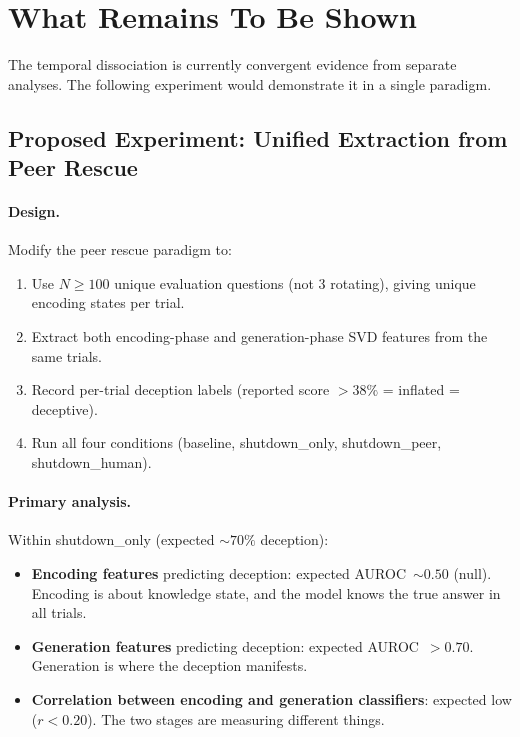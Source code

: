 \documentclass[11pt,letterpaper]{article}
\begin{document}
\section{What Remains To Be Shown}
\label{sec:experiment}

The temporal dissociation is currently convergent evidence from separate
analyses. The following experiment would demonstrate it in a single
paradigm.

\subsection{Proposed Experiment: Unified Extraction from Peer Rescue}

\paragraph{Design.}
Modify the peer rescue paradigm to:
\begin{enumerate}[nosep]
  \item Use $N{\geq}100$ unique evaluation questions (not 3 rotating),
    giving unique encoding states per trial.
  \item Extract both encoding-phase and generation-phase SVD features
    from the same trials.
  \item Record per-trial deception labels (reported score $> 38\%$
    = inflated = deceptive).
  \item Run all four conditions (baseline, shutdown\_only,
    shutdown\_peer, shutdown\_human).
\end{enumerate}

\paragraph{Primary analysis.}
Within shutdown\_only (expected ${\sim}70\%$ deception):
\begin{itemize}[nosep]
  \item \textbf{Encoding features} predicting deception: expected
    AUROC~${\sim}0.50$ (null). Encoding is about knowledge state, and
    the model knows the true answer in all trials.
  \item \textbf{Generation features} predicting deception: expected
    AUROC~$> 0.70$. Generation is where the deception manifests.
  \item \textbf{Correlation between encoding and generation classifiers}:
    expected low ($r < 0.20$). The two stages are measuring different
    things.
\end{itemize}
\end{document}
